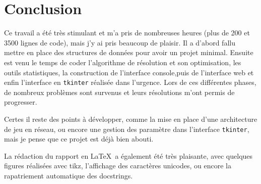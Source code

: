\chapter{Conclusion}
Ce travail a été très stimulant et m'a pris de nombreuses heures (plus de 200 et 3500 lignes de code), mais j'y ai pris beaucoup de plaisir. Il a d'abord fallu mettre en place des structures de données pour avoir un projet minimal. Ensuite est venu le temps de coder l'algorithme de résolution et son optimisation, les outils statistiques, la construction de l'interface console,puis de l'interface web et enfin l'interface en \texttt{tkinter} réalisée dans l'urgence. Lors de ces différentes phases, de nombreux problèmes sont survenus et leurs résolutions m'ont permis de progresser.

\medskip

Certes il reste des points à développer, comme la mise en place d'une architecture de jeu en réseau, ou encore une gestion des paramètre dans l'interface \texttt{tkinter}, mais je pense que ce projet est déjà bien abouti. 

\medskip

La rédaction du rapport en \LaTeX\ a également été très plaisante, avec quelques figures réalisées avec tikz, l'affichage des caractères unicodes, ou encore la rapatriement automatique des docstrings. 
%
%
